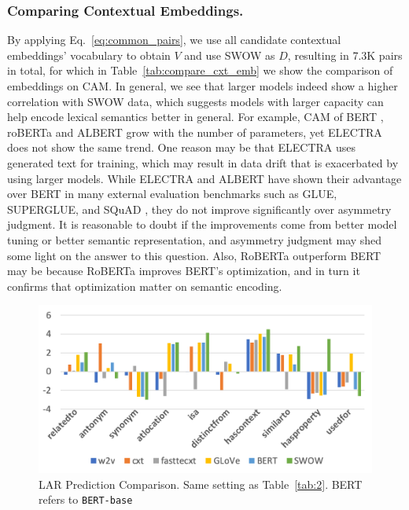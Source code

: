 \documentclass[letterpaper]{article} %
\begin{document}
\subsubsection{Comparing Contextual Embeddings.}
By applying Eq.~\ref{eq:common_pairs}, we use all candidate contextual embeddings' vocabulary to obtain $V$ and use SWOW as $D$, resulting in 7.3K pairs in total, for which in Table~\ref{tab:compare_cxt_emb} we show the comparison of embeddings on CAM. In general, we see that larger models indeed show a higher correlation with SWOW data, which suggests models with larger capacity can help encode lexical semantics better in general. For example, CAM of BERT \cite{devlin2018bert}, roBERTa \cite{liu2019roberta} and ALBERT \cite{lan2019albert} grow with the number of parameters, yet ELECTRA \cite{clark2020electra} does not show the same trend. One reason may be that ELECTRA uses generated text for training, which may result in data drift that is exacerbated by using larger models. While ELECTRA and ALBERT have shown their advantage over BERT in many external evaluation benchmarks such as GLUE, SUPERGLUE, and SQuAD \cite{rajpurkar-etal-2016-squad,wang2018glue,wang2019superglue}, they do not improve significantly over asymmetry judgment. It is reasonable to doubt if the improvements come from better model tuning or better semantic representation, and asymmetry judgment may shed some light on the answer to this question. Also, RoBERTa outperform BERT may be because RoBERTa improves BERT's optimization, and in turn it confirms that optimization matter on semantic encoding.

\begin{figure}%
  \includegraphics[width=\linewidth]{abs_lar.png}
  \caption{LAR Prediction Comparison. Same setting as Table~\ref{tab:2}. BERT refers to \texttt{BERT-base}}
  \label{fig:lar_dir}
\end{figure}
\end{document}
